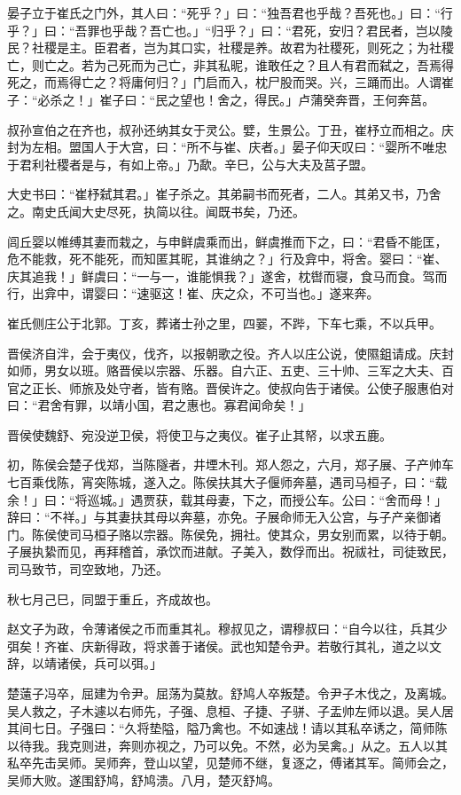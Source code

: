 \documentclass[]{article}
\begin{document}
晏子立于崔氏之门外，其人曰：``死乎？」曰：``独吾君也乎哉？吾死也。」曰：``行乎？」曰：``吾罪也乎哉？吾亡也。」``归乎？」曰：``君死，安归？君民者，岂以陵民？社稷是主。臣君者，岂为其口实，社稷是养。故君为社稷死，则死之；为社稷亡，则亡之。若为己死而为己亡，非其私昵，谁敢任之？且人有君而弑之，吾焉得死之，而焉得亡之？将庸何归？」门启而入，枕尸股而哭。兴，三踊而出。人谓崔子：``必杀之！」崔子曰：``民之望也！舍之，得民。」卢蒲癸奔晋，王何奔莒。

叔孙宣伯之在齐也，叔孙还纳其女于灵公。嬖，生景公。丁丑，崔杼立而相之。庆封为左相。盟国人于大宫，曰：``所不与崔、庆者。」晏子仰天叹曰：``婴所不唯忠于君利社稷者是与，有如上帝。」乃歃。辛巳，公与大夫及莒子盟。

大史书曰：``崔杼弑其君。」崔子杀之。其弟嗣书而死者，二人。其弟又书，乃舍之。南史氏闻大史尽死，执简以往。闻既书矣，乃还。

闾丘婴以帷缚其妻而栽之，与申鲜虞乘而出，鲜虞推而下之，曰：``君昏不能匡，危不能救，死不能死，而知匿其昵，其谁纳之？」行及弇中，将舍。婴曰：``崔、庆其追我！」鲜虞曰：``一与一，谁能惧我？」遂舍，枕辔而寝，食马而食。驾而行，出弇中，谓婴曰：``速驱这！崔、庆之众，不可当也。」遂来奔。

崔氏侧庄公于北郭。丁亥，葬诸士孙之里，四翣，不跸，下车七乘，不以兵甲。

晋侯济自泮，会于夷仪，伐齐，以报朝歌之役。齐人以庄公说，使隰鉏请成。庆封如师，男女以班。赂晋侯以宗器、乐器。自六正、五吏、三十帅、三军之大夫、百官之正长、师旅及处守者，皆有赂。晋侯许之。使叔向告于诸侯。公使子服惠伯对曰：``君舍有罪，以靖小国，君之惠也。寡君闻命矣！」

晋侯使魏舒、宛没逆卫侯，将使卫与之夷仪。崔子止其帑，以求五鹿。

初，陈侯会楚子伐郑，当陈隧者，井堙木刊。郑人怨之，六月，郑子展、子产帅车七百乘伐陈，宵突陈城，遂入之。陈侯扶其大子偃师奔墓，遇司马桓子，曰：``载余！」曰：``将巡城。」遇贾获，载其母妻，下之，而授公车。公曰：``舍而母！」辞曰：``不祥。」与其妻扶其母以奔墓，亦免。子展命师无入公宫，与子产亲御诸门。陈侯使司马桓子赂以宗器。陈侯免，拥社。使其众，男女别而累，以待于朝。子展执絷而见，再拜稽首，承饮而进献。子美入，数俘而出。祝祓社，司徒致民，司马致节，司空致地，乃还。

秋七月己巳，同盟于重丘，齐成故也。

赵文子为政，令薄诸侯之币而重其礼。穆叔见之，谓穆叔曰：``自今以往，兵其少弭矣！齐崔、庆新得政，将求善于诸侯。武也知楚令尹。若敬行其礼，道之以文辞，以靖诸侯，兵可以弭。」

楚薳子冯卒，屈建为令尹。屈荡为莫敖。舒鸠人卒叛楚。令尹子木伐之，及离城。吴人救之，子木遽以右师先，子强、息桓、子捷、子骈、子盂帅左师以退。吴人居其间七日。子强曰：``久将垫隘，隘乃禽也。不如速战！请以其私卒诱之，简师陈以待我。我克则进，奔则亦视之，乃可以免。不然，必为吴禽。」从之。五人以其私卒先击吴师。吴师奔，登山以望，见楚师不继，复逐之，傅诸其军。简师会之，吴师大败。遂围舒鸠，舒鸠溃。八月，楚灭舒鸠。
\end{document}
